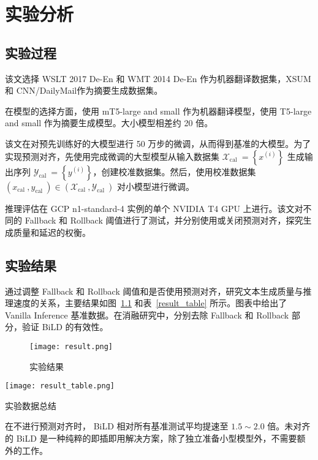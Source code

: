 \chapter{实验分析}

\section{实验过程}

该文选择 WSLT 2017 De-En 和 WMT 2014 De-En 作为机器翻译数据集，XSUM 和 CNN/DailyMail作为摘要生成数据集。

在模型的选择方面，使用 mT5-large and small 作为机器翻译模型，使用 T5-large and small  作为摘要生成模型。大小模型相差约 20 倍。

该文在对预先训练好的大模型进行 50 万步的微调，从而得到基准的大模型。为了实现预测对齐，先使用完成微调的大型模型从输入数据集 $\mathcal{X}_{\text {cal }}=\left\{x^{(i)}\right\}$ 生成输出序列 $\mathcal{Y}_{\text {cal }}=\left\{y^{(i)}\right\}$，创建校准数据集。然后，使用校准数据集 $\left(x_{\text {cal }}, y_{\text {cal }}\right) \in\left(\mathcal{X}_{\text {cal }}, \mathcal{Y}_{\text {cal }}\right)$ 对小模型进行微调。

推理评估在 GCP n1-standard-4 实例的单个 NVIDIA T4 GPU 上进行。该文对不同的 Fallback 和 Rollback 阈值进行了测试，并分别使用或关闭预测对齐，探究生成质量和延迟的权衡。

\section{实验结果}

通过调整 Fallback 和 Rollback 阈值和是否使用预测对齐，研究文本生成质量与推理速度的关系，主要结果如图~\ref{result} 和表~\ref{result_table} 所示。图表中给出了 Vanilla Inference 基准数据。在消融研究中，分别去除 Fallback 和 Rollback 部分，验证 BiLD 的有效性。

\begin{figure}[htbp]
    \centering
    \texttt{[image: result.png]}
    \caption{实验结果}
    \label{result}
\end{figure}

\begin{table}[htbp]
    \centering
    \texttt{[image: result\_table.png]}
    \caption{实验数据总结}
    \label{result_table}
\end{table}
在不进行预测对齐时， BiLD 相对所有基准测试平均提速至 $1.5\sim 2.0$ 倍。未对齐的 BiLD 是一种纯粹的即插即用解决方案，除了独立准备小型模型外，不需要额外的工作。

